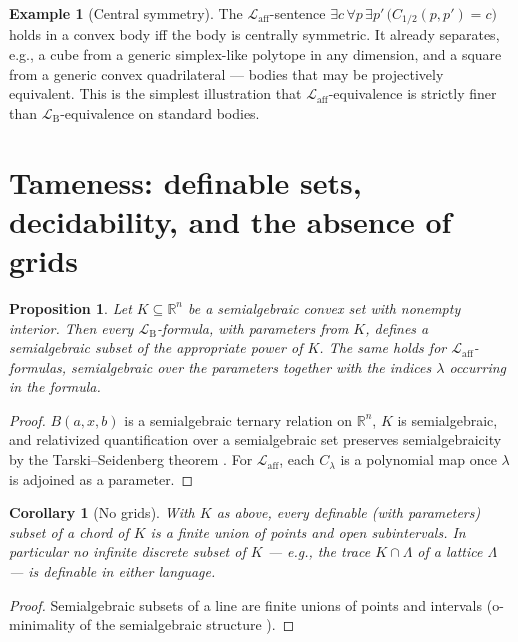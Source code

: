 \documentclass[11pt]{amsart}
\newtheorem{proposition}[theorem]{Proposition}
\newtheorem{corollary}[theorem]{Corollary}
\theoremstyle{definition}
\newtheorem{example}[theorem]{Example}
\newcommand{\R}{\mathbb{R}}
\newcommand{\Laff}{\mathcal{L}_{\mathrm{aff}}}
\newcommand{\LB}{\mathcal{L}_{\mathrm{B}}}
\begin{document}
\begin{example}[Central symmetry]\label{ex:centralsym}
The $\Laff$-sentence $\exists c\,\forall p\,\exists p'\,
\bigl(C_{1/2}(p,p')=c\bigr)$ holds in a convex body iff the body is centrally
symmetric. It already separates, e.g., a cube from a generic simplex-like
polytope in any dimension, and a square from a generic convex
quadrilateral --- bodies that may be projectively equivalent. This is the
simplest illustration that $\Laff$-equivalence is strictly finer than
$\LB$-equivalence on standard bodies.
\end{example}

\section{Tameness: definable sets, decidability, and the absence of grids}
\label{sec:tame}

\begin{proposition}\label{prop:semialgebraic}
Let $K\subseteq\R^n$ be a semialgebraic convex set with nonempty interior.
Then every $\LB$-formula, with parameters from $K$, defines a semialgebraic
subset of the appropriate power of $K$. The same holds for $\Laff$-formulas,
semialgebraic over the parameters together with the indices $\lambda$
occurring in the formula.
\end{proposition}

\begin{proof}
$B(a,x,b)$ is a semialgebraic ternary relation on $\R^n$, $K$ is
semialgebraic, and relativized quantification over a semialgebraic set
preserves semialgebraicity by the Tarski--Seidenberg theorem \cite{Tarski51,
vdDries98}. For $\Laff$, each $C_\lambda$ is a polynomial map once $\lambda$
is adjoined as a parameter.
\end{proof}

\begin{corollary}[No grids]\label{cor:nogrids}
With $K$ as above, every definable (with parameters) subset of a chord of $K$
is a finite union of points and open subintervals. In particular no infinite
discrete subset of $K$ --- e.g., the trace $K\cap\Lambda$ of a lattice
$\Lambda$ --- is definable in either language.
\end{corollary}

\begin{proof}
Semialgebraic subsets of a line are finite unions of points and intervals
(o-minimality of the semialgebraic structure \cite{vdDries98}).
\end{proof}
\end{document}
